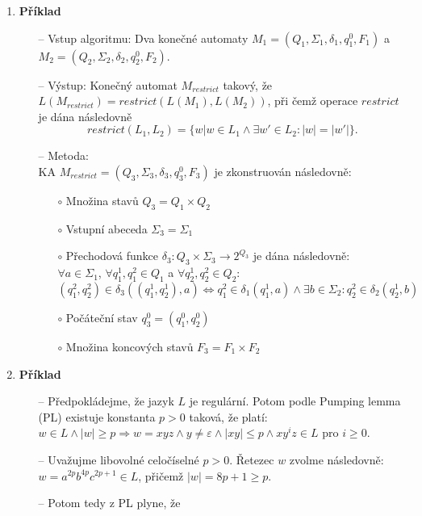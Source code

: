 \documentclass[a4paper,12pt]{article}
\begin{document}
\begin{enumerate}[label=\textbf{\arabic*}.]
 \item {\bfseries Příklad}
   \begin{itemize}
     \item[--] Vstup algoritmu: Dva konečné automaty $M_1 = (Q_1, \Sigma_1, \delta_1, q_1^0, F_1)$ a $M_2 = (Q_2, \Sigma_2, \delta_2, q_2^0, F_2)$.
     \item[--] Výstup: Konečný automat $M_{restrict}$ takový, že $L(M_{restrict}) = restrict(L(M_1), L(M_2))$, při čemž operace $restrict$ je dána následovně 
      $$ restrict(L_1, L_2) = \{ w | w\in L_1 \wedge \exists w'\in L_2: |w| = |w'| \}. $$
     \item[--] Metoda:\\
     KA $M_{restrict} = (Q_3, \Sigma_3, \delta_3, q_3^0, F_3)$ je zkonstruován následovně:
     \begin{itemize}
      \item[$\circ$] Množina stavů $Q_3 = Q_1\times Q_2$
      \item[$\circ$] Vstupní abeceda $\Sigma_3 = \Sigma_1$
      \item[$\circ$] Přechodová funkce $\delta_3: Q_3\times \Sigma_3 \rightarrow 2^{Q_3}$ je dána následovně:\\
	$\forall a\in \Sigma_1$, $\forall q_1^1, q_1^2\in Q_1$ a $\forall q_2^1, q_2^2\in Q_2$:
	$$ (q_1^2, q_2^2) \in \delta_3((q_1^1, q_2^1), a) \Leftrightarrow q_1^2\in\delta_1(q_1^1, a) \wedge \exists b\in\Sigma_2 : q_2^2\in\delta_2(q_2^1, b)$$
      \item[$\circ$] Počáteční stav $q_3^0 = (q_1^0, q_2^0)$
      \item[$\circ$] Množina koncových stavů $F_3 = F_1\times F_2$
     \end{itemize}
    \end{itemize}
 \item {\bfseries Příklad}
  \begin{itemize}
    \item[--] Předpokládejme, že jazyk $L$ je regulární. Potom podle Pumping lemma (PL) existuje konstanta $p > 0$ taková, že platí: 
    $w\in L\wedge |w| \geq p \Rightarrow w = xyz \wedge y\neq\varepsilon \wedge |xy|\leq p\wedge xy^iz\in L $ pro $i \geq 0$.
    \item[--] Uvažujme libovolné celočíselné $p > 0$. Řetezec $w$ zvolme následovně: \\$w = a^{2p}b^{4p}c^{2p+1} \in L$, přičemž $|w| = 8p + 1 \geq p$.
    \item[--] Potom tedy z PL plyne, že 

\end{itemize}
\end{enumerate}
\end{document}
